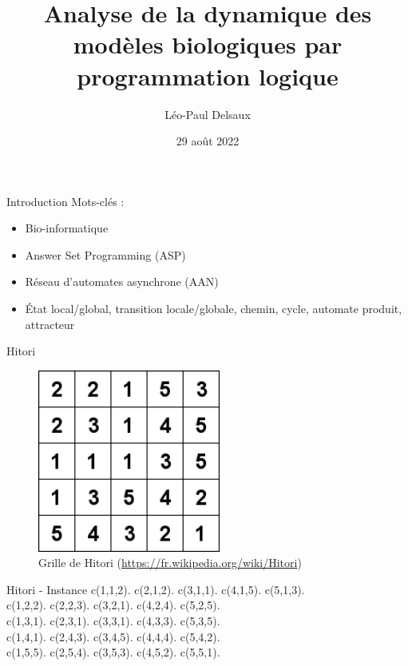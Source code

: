 \documentclass{beamer}
\title{Analyse de la dynamique des modèles biologiques par programmation logique}
\author{Léo-Paul Delsaux}
\institute{Stage effectué au laboratoire CRIStAL de Villeneuve-d'Ascq}
\date{29 août 2022}
\begin{document}
\maketitle

\begin{frame}{Introduction}
	Mots-clés :
	\begin{itemize}
		\item Bio-informatique
		\item Answer Set Programming (ASP)
		\item Réseau d'automates asynchrone (AAN)
		\item \'Etat local/global, transition locale/globale, chemin, cycle, automate produit, attracteur
	\end{itemize}
\end{frame}

\begin{frame}{Hitori}
	\begin{figure}[!h]
		\includegraphics[width=6cm]{hitori.png}
		\caption{Grille de Hitori (\href{https://fr.wikipedia.org/wiki/Hitori}{https://fr.wikipedia.org/wiki/Hitori})}
		\label{label-figure1}
	\end{figure}
\end{frame}

\begin{frame}{Hitori - Instance}
	\pause
	c(1,1,2). c(2,1,2). c(3,1,1). c(4,1,5). c(5,1,3).\\
	c(1,2,2). c(2,2,3). c(3,2,1). c(4,2,4). c(5,2,5).\\
	c(1,3,1). c(2,3,1). c(3,3,1). c(4,3,3). c(5,3,5).\\
	c(1,4,1). c(2,4,3). c(3,4,5). c(4,4,4). c(5,4,2).\\
	c(1,5,5). c(2,5,4). c(3,5,3). c(4,5,2). c(5,5,1).\\
\end{frame}
\end{document}
